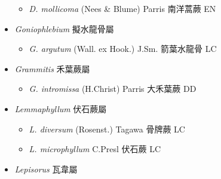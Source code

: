 \begin{itemize}
  \begin{itemize}
        \item[] \textit{D. mollicoma} (Nees \& Blume) Parris  南洋蒿蕨   EN
  \end{itemize}
 \item[] \textit{Goniophlebium} 擬水龍骨屬
                                
  \begin{itemize}
        \item[] \textit{G. argutum} (Wall. ex Hook.) J.Sm.  箭葉水龍骨   LC
  \end{itemize}
 \item[] \textit{Grammitis} 禾葉蕨屬
                                
  \begin{itemize}
        \item[] \textit{G. intromissa} (H.Christ) Parris  大禾葉蕨   DD
  \end{itemize}
 \item[] \textit{Lemmaphyllum} 伏石蕨屬
                                
  \begin{itemize}
        \item[] \textit{L. diversum} (Rosenst.) Tagawa  骨牌蕨   LC
        \item[] \textit{L. microphyllum} C.Presl  伏石蕨   LC
  \end{itemize}
 \item[] \textit{Lepisorus} 瓦韋屬
                                

\end{itemize}
